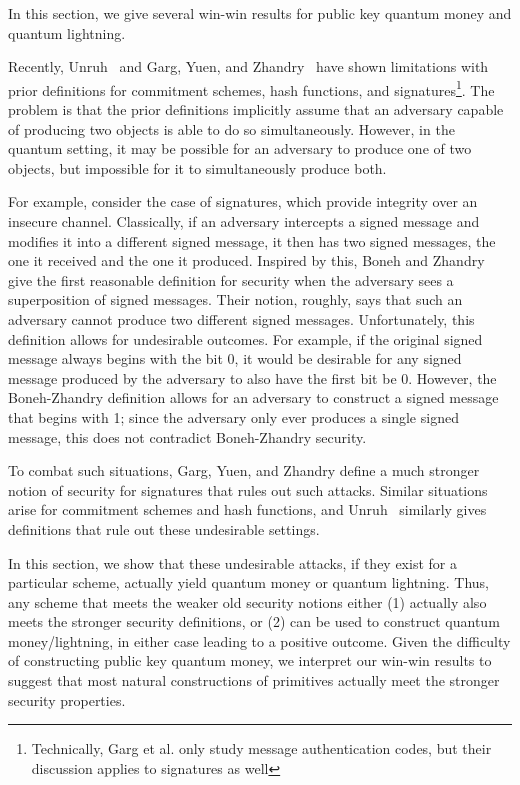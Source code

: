 \label{sec:winwin}

In this section, we give several win-win results for public key quantum money and quantum lightning.  

Recently, Unruh~\cite{EC:Unruh16} and Garg, Yuen, and Zhandry~\cite{C:GarYueZha17} have shown limitations with prior definitions for commitment schemes, hash functions, and signatures\footnote{Technically, Garg et al. only study message authentication codes, but their discussion applies to signatures as well}.  The problem is that the prior definitions implicitly assume that an adversary capable of producing two objects is able to do so simultaneously.  However, in the quantum setting, it may be possible for an adversary to produce one of two objects, but impossible for it to simultaneously produce both.  

For example, consider the case of signatures, which provide integrity over an insecure channel.  Classically, if an adversary intercepts a signed message and modifies it into a different signed message, it then has two signed messages, the one it received and the one it produced.  Inspired by this, Boneh and Zhandry give the first reasonable definition for security when the adversary sees a superposition of signed messages.  Their notion, roughly, says that such an adversary cannot produce two different signed messages.  Unfortunately, this definition allows for undesirable outcomes.  For example, if the original signed message always begins with the bit 0, it would be desirable for any signed message produced by the adversary to also have the first bit be 0.  However, the Boneh-Zhandry definition allows for an adversary to construct a signed message that begins with 1; since the adversary only ever produces a single signed message, this does not contradict Boneh-Zhandry security.  

To combat such situations, Garg, Yuen, and Zhandry define a much stronger notion of security for signatures that rules out such attacks.  Similar situations arise for commitment schemes and hash functions, and Unruh~\cite{EC:Unruh16} similarly gives definitions that rule out these undesirable settings.  

In this section, we show that these undesirable attacks, if they exist for a particular scheme, actually yield quantum money or quantum lightning.  Thus, any scheme that meets the weaker old security notions either (1) actually also meets the stronger security definitions, or (2) can be used to construct quantum money/lightning, in either case leading to a positive outcome.  Given the difficulty of constructing public key quantum money, we interpret our win-win results to suggest that most natural constructions of primitives actually meet the stronger security properties.

